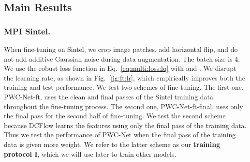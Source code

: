 \documentclass[10pt,journal,cspaper,compsoc]{IEEEtran}
\begin{document}
	
	\subsection{Main Results}
	
	\subsubsection{MPI Sintel.}
	When fine-tuning on Sintel, we crop  image patches, add horizontal flip, and do not add additive Gaussian noise during data augmentation. The batch size is 4. 
	We use the robust loss function in Eq.~\eqref{eq:multi:loss:lq} with  and . 
	We disrupt the learning rate, as shown in Fig.~\ref{fig:ft:lr}, which empirically improves both the training and test performance.
	We test two schemes of fine-tuning. The first one, PWC-Net-ft, uses the clean and final passes of the Sintel training data throughout the fine-tuning process. The second one, PWC-Net-ft-final, uses only the final pass for the second half of fine-tuning. We test the second scheme because DCFlow learns the features using only the final pass of the training data. Thus we test the performance of PWC-Net when the final pass of the training data is given more weight. We refer to the latter scheme as our \textbf{training protocol I}, which we will use later to train other models. 
\end{document}
